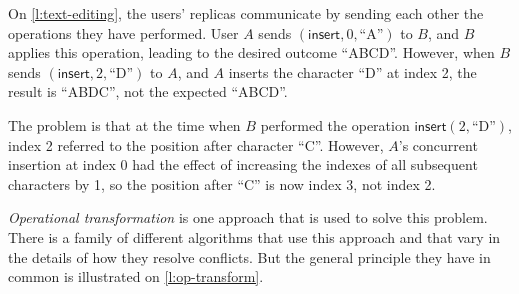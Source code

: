 On \autoref{l:text-editing}, the users' replicas communicate by sending each other the operations they have performed.
User $A$ sends $(\mathsf{insert}, 0, \text{``A''})$ to $B$, and $B$ applies this operation, leading to the desired outcome ``ABCD''.
However, when $B$ sends $(\mathsf{insert}, 2, \text{``D''})$ to $A$, and $A$ inserts the character ``D'' at index 2, the result is ``ABDC'', not the expected ``ABCD''.

The problem is that at the time when $B$ performed the operation $\mathsf{insert}(2, \text{``D''})$, index 2 referred to the position after character ``C''.
However, $A$'s concurrent insertion at index 0 had the effect of increasing the indexes of all subsequent characters by 1, so the position after ``C'' is now index 3, not index 2.

\emph{Operational transformation} is one approach that is used to solve this problem.
There is a family of different algorithms that use this approach and that vary in the details of how they resolve conflicts.
But the general principle they have in common is illustrated on \autoref{l:op-transform}.

